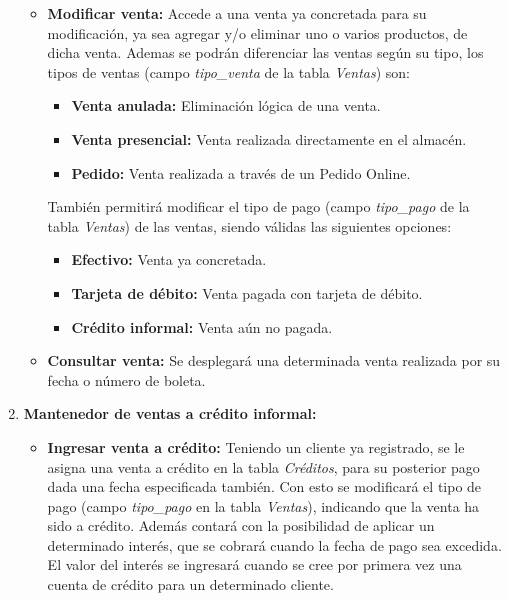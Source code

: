\documentclass[letterpaper,12pt]{article}
\begin{document}
\begin{enumerate}
\begin{itemize}
\item \textbf{Modificar venta: }
Accede a una venta ya concretada para su modificación, ya sea agregar y/o eliminar uno o varios productos, de dicha venta.
Ademas se podrán diferenciar las ventas según su tipo, los tipos de ventas (campo \emph{tipo\_venta} de la tabla \emph{Ventas}) son:\begin{itemize}

\item \textbf{Venta anulada:} Eliminación lógica de una venta.

\item \textbf{Venta presencial:} Venta realizada directamente en el almacén.

\item \textbf{Pedido:} Venta realizada a través de un Pedido Online.
\end{itemize}

También permitirá modificar el tipo de pago (campo \emph{tipo\_pago} de la tabla \emph{Ventas}) de las ventas, siendo válidas las siguientes opciones:

\begin{itemize}
\item \textbf{Efectivo:} Venta ya concretada.
\item \textbf{Tarjeta de débito:} Venta pagada con tarjeta de débito.
\item \textbf{Crédito informal:} Venta aún no pagada. 
\end{itemize}


\item \textbf{Consultar venta: }
Se desplegará una determinada venta realizada por su fecha o número de boleta.

\end{itemize}


\item \textbf{Mantenedor de ventas a crédito informal:} 

\begin{itemize}
\item \textbf{Ingresar venta a crédito: }
Teniendo un cliente ya registrado, se le asigna una venta a crédito en la tabla \emph{Créditos}, para su posterior pago dada una
fecha especificada también. Con esto se modificará el tipo de pago (campo \emph{tipo\_pago} en la tabla 
        \emph{Ventas}), indicando que la venta ha sido a crédito.
Además contará con la posibilidad de aplicar un determinado interés, que se cobrará cuando la fecha de pago
sea excedida. El valor del interés se ingresará cuando se cree por primera vez una cuenta de crédito para un determinado cliente.  


\end{itemize}
\end{enumerate}
\end{document}
